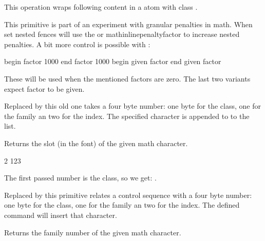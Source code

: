 \stopnewprimitive

\startoldprimitive[title={\prm {mathbin}}]

This operation wraps following content in a atom with class .

\stopoldprimitive

\startnewprimitive[title={\prm {mathboundary}}]

This primitive is part of an experiment with granular penalties in math. When set
nested fences will use the  or \prm
{mathinlinepenaltyfactor} to increase nested penalties. A bit more control is
possible with :

\starttabulate[||||]
 \NC begin \NC factor 1000  \NC \NR
{} \NC end   \NC factor 1000  \NC \NR
{} \NC begin \NC given factor \NC \NR
{} \NC end   \NC given factor \NC \NR
\stoptabulate

These will be used when the mentioned factors are zero. The last two variants
expect factor to be given.

\stopnewprimitive

\startoldprimitive[title={\prm {mathchar}}][obsolete=yes]

Replaced by  this old one takes a four byte number: one byte for
the class, one for the family an two for the index. The specified character is
appended to to the list.

\stopoldprimitive

\startnewprimitive[title={\prm {mathcharclass}}]

Returns the slot (in the font) of the given math character.

\startbuffer
\the\mathcharclass{} 2 123
\stopbuffer

\typebuffer

The first passed number is the class, so we get: \inlinebuffer.

\stopnewprimitive

\startoldprimitive[title={\prm {mathchardef}}][obsolete=yes]

Replaced by  this primitive relates a control sequence with a
four byte number: one byte for the class, one for the family an two for the
index. The defined command will insert that character.

\stopoldprimitive

\startnewprimitive[title={\prm {mathcharfam}}]

Returns the family number of the given math character.

